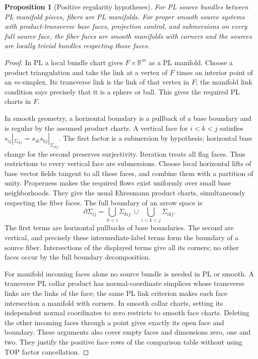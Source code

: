 \documentclass[11pt,a4paper]{article}
\newtheorem{proposition}[theorem]{Proposition}
\theoremstyle{definition}
\newcommand{\R}{\mathbb R}
\begin{document}
\begin{proposition}[Positive regularity hypotheses]\label{prop:positive-regular}
For PL source bundles between PL manifold pieces, fibers are PL
manifolds. For proper smooth source systems with product-transverse
base faces, projection control, and submersions on every full source
face, the fiber faces are smooth manifolds with corners and the sources
are locally trivial bundles respecting those faces.
\end{proposition}
\begin{proof}
In PL a local bundle chart gives $F\times\R^m$ as a PL manifold.
Choose a product triangulation and take the link at a vertex of $F$
times an interior point of an $m$-simplex. Its transverse link is the
link of that vertex in $F$; the manifold link condition says precisely
that it is a sphere or ball. This gives the required PL charts in $F$.

In smooth geometry, a horizontal boundary is a pullback of a base
boundary and is regular by the assumed product charts. A vertical
face for $i<k<j$ satisfies
$s_{ij}|_{\Sigma_{ikj}}=s_{ik}s_{kj}|_{\Sigma_{ikj}}$.
The first factor is a submersion by hypothesis; horizontal base change
for the second preserves surjectivity. Iteration treats all flag faces.
Thus restrictions to every vertical face are submersions. Choose local
horizontal lifts of base vector fields tangent to all these faces,
and combine them with a partition of unity. Properness makes the
required flows exist uniformly over small base neighborhoods.
They give the usual Ehresmann product charts, simultaneously respecting
the fiber faces. The full boundary of an arrow space is
\[
 \partial\Sigma_{ij}
 =\bigcup_{k<i}\Sigma_{kij}\ \cup\!
   \bigcup_{i<k<j}\Sigma_{ikj}.
\]
The first terms are horizontal pullbacks of base boundaries. The second
are vertical, and precisely these intermediate-label terms form the
boundary of a source fiber. Intersections of the displayed terms give
all its corners; no other faces occur by the full boundary decomposition.

For manifold incoming faces alone no source bundle is needed in PL or
smooth. A transverse PL collar product has normal-coordinate simplices
whose transverse links are the links of the face; the same PL link
criterion makes each face intersection a manifold with corners. In
smooth collar charts, setting its independent normal coordinates to
zero restricts to smooth face charts. Deleting the other incoming faces
through a point gives exactly its open face and boundary. These
arguments also cover empty faces and dimensions zero, one and two.
They justify the positive face rows of the comparison table without
using TOP factor cancellation.
\end{proof}
\end{document}
